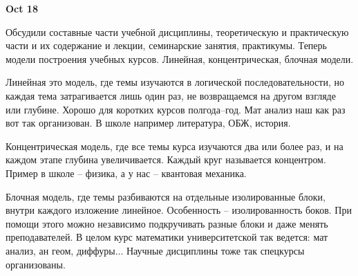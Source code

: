 \documentclass[a4paper, 12pt]{article}
\begin{document}
\hfill\textbf{Oct 18}

Обсудили составные части учебной дисциплины, теоретическую 
и практическую части и их содержание и лекции, семинарские занятия, 
практикумы. Теперь модели построения учебных курсов. Линейная, 
концентрическая, блочная модели.

Линейная это модель, где темы изучаются в логической последовательности, 
но каждая тема затрагивается лишь один раз, не возвращаемся на другом 
взгляде или глубине. Хорошо для коротких курсов полгода--год. Мат анализ 
наш как раз вот так организован. В школе например литература, ОБЖ, 
история.

Концентрическая модель, где все темы курса изучаются два или более раз, 
и на каждом этапе глубина увеличивается. Каждый круг называется 
концентром. Пример в школе -- физика, а у нас -- квантовая механика.

Блочная модель, где темы разбиваются на отдельные изолированные блоки, 
внутри каждого изложение линейное. Особенность -- изолированность боков. 
При помощи этого можно независимо подкручивать разные блоки и даже 
менять преподавателей. В целом курс математики университетской так 
ведется: мат анализ, ан геом, диффуры... Научные дисциплины тоже так 
спецкурсы организованы.
\end{document}
